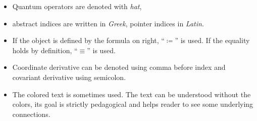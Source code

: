 \begin{itemize}
	\item Quantum operators are denoted with \emph{hat}, 
	\item abstract indices are written in \emph{Greek}, pointer indices in \emph{Latin}. 
	\item If the object is defined by the formula on right, “$\coloneqq$” is used. If the equality holds by definition, “$\equiv$” is used. 
	\item Coordinate derivative can be denoted using comma before index and covariant derivative using semicolon. 
	\item The colored text is sometimes used. The text can be understood without the colors, its goal is strictly pedagogical and helps reader to see some underlying connections.
\end{itemize}